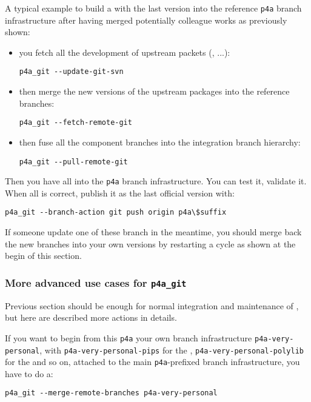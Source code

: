 \documentclass[a4paper]{article}
\begin{document}
A typical example to build a \Apfa with the last \Apips version into the
reference \verb|p4a| branch infrastructure after having merged potentially
colleague works as previously shown:
\begin{itemize}
\item you fetch all the development of upstream packets (\Apips,
  \Apolylib...):
\begin{verbatim}
p4a_git --update-git-svn
\end{verbatim}
\item then merge the new versions of the upstream packages into the \Apfa
  reference branches:
\begin{verbatim}
p4a_git --fetch-remote-git
\end{verbatim}
\item then fuse all the component branches into the \Apfa integration
  branch hierarchy:
\begin{verbatim}
p4a_git --pull-remote-git
\end{verbatim}
\end{itemize}
Then you have all \Apfa into the \verb|p4a| branch infrastructure. You can
test it, validate it. When all is correct, publish it as the last official
version with:
\begin{verbatim}
p4a_git --branch-action git push origin p4a\$suffix
\end{verbatim}
If someone update one of these branch in the meantime, you should merge
back the new branches into your own versions by restarting a cycle as
shown at the begin of this section.


\subsubsection{More advanced use cases for \protect\texttt{p4a\_git}}
\label{sec:more-advanced-use}

Previous section should be enough for normal integration and maintenance
of \Apfa, but here are described more actions in details.

If you want to begin from this \texttt{p4a} your own branch infrastructure
\verb|p4a-very-personal|, with \verb|p4a-very-personal-pips| for the
\Apips, \verb|p4a-very-personal-polylib| for the \Apolylib and so on,
attached to the main \verb|p4a|-prefixed branch infrastructure, you have
to do a:
\begin{verbatim}
p4a_git --merge-remote-branches p4a-very-personal
\end{verbatim}
\end{document}
